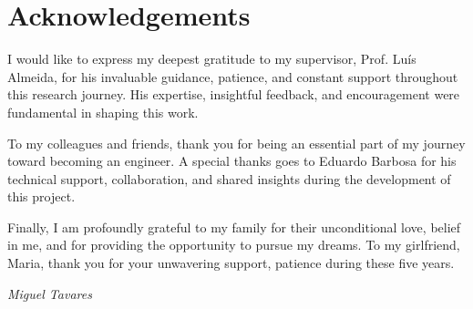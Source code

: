\chapter*{Acknowledgements}

I would like to express my deepest gratitude to my supervisor, Prof. Luís Almeida, for his invaluable guidance, patience, and constant support throughout this research journey. His expertise, insightful feedback, and encouragement were fundamental in shaping this work.

To my colleagues and friends, thank you for being an essential part of my journey toward becoming an engineer. A special thanks goes to Eduardo Barbosa for his technical support, collaboration, and shared insights during the development of this project.

Finally, I am profoundly grateful to my family for their unconditional love, belief in me, and for providing the opportunity to pursue my dreams. To my girlfriend, Maria, thank you for your unwavering support, patience during these five years.

\vspace{1.5cm}

\noindent\textit{Miguel Tavares}
